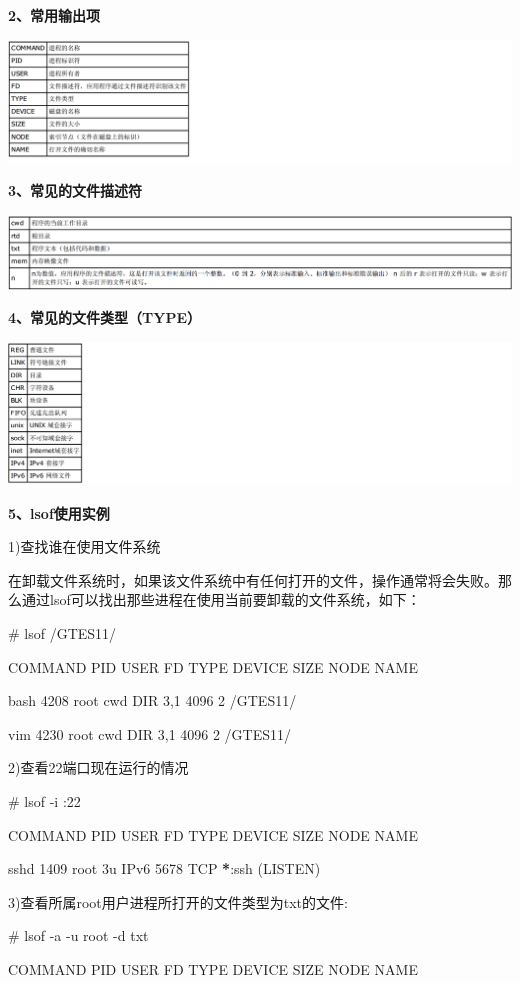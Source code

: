 \documentclass[letterpaper,10pt]{sphinxmanual}
\begin{document}
\textbf{2、常用输出项}

\includegraphics{lsof1.png}

\textbf{3、常见的文件描述符}

\includegraphics{lsof2.png}

\textbf{4、常见的文件类型（TYPE）}

\includegraphics{lsof3.png}

\textbf{5、lsof使用实例}

1)查找谁在使用文件系统

在卸载文件系统时，如果该文件系统中有任何打开的文件，操作通常将会失败。那么通过lsof可以找出那些进程在使用当前要卸载的文件系统，如下：

\# lsof  /GTES11/

COMMAND  PID USER   FD   TYPE DEVICE SIZE NODE NAME

bash    4208 root  cwd    DIR    3,1 4096    2 /GTES11/

vim     4230 root  cwd    DIR    3,1 4096    2 /GTES11/

2)查看22端口现在运行的情况

\# lsof -i :22

COMMAND  PID USER   FD   TYPE DEVICE SIZE NODE NAME

sshd    1409 root    3u  IPv6   5678       TCP {\color{red}\bfseries{}*}:ssh (LISTEN)

3)查看所属root用户进程所打开的文件类型为txt的文件:

\# lsof -a -u root -d txt

COMMAND    PID USER  FD      TYPE DEVICE    SIZE    NODE NAME
\end{document}
